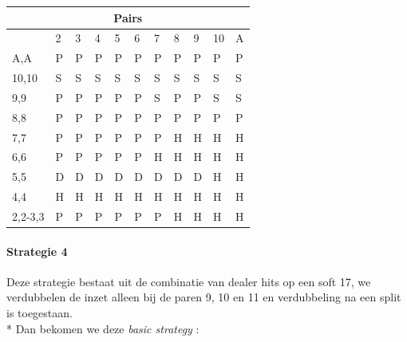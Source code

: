 \documentclass[conference]{IEEEtran}
\begin{document}
\begin{table}[ht]
\begin{tabular}{|l|l|l|l|l|l|l|l|l|l|l|}
\multicolumn{11}{|c|}{\textbf{Pairs}}                                 \\ \hline
                             & 2 & 3 & 4 & 5 & 6 & 7 & 8 & 9 & 10 & A \\ \hline
A,A                          & P & P & P & P & P & P & P & P & P & P  \\ \hline
10,10                        & S & S & S & S & S & S & S & S & S & S  \\ \hline
9,9                          & P & P & P & P & P & S & P & P & S & S  \\ \hline
8,8                          & P & P & P & P & P & P & P & P & P & P  \\ \hline
7,7                          & P & P & P & P & P & P & H & H & H & H  \\ \hline
6,6                          & P & P & P & P & P & H & H & H & H & H  \\ \hline
5,5                          & D & D & D & D & D & D & D & D & H & H  \\ \hline
4,4                          & H & H & H & H & H & H & H & H & H & H  \\ \hline
2,2-3,3                      & P & P & P & P & P & P & H & H & H & H  \\ \hline
\end{tabular}
\end{table}

\newpage

\paragraph{Strategie 4}

Deze strategie bestaat uit de combinatie van dealer hits op een soft 17, we verdubbelen de inzet alleen bij de paren 9, 10 en 11 en verdubbeling na een split is toegestaan.\\*
Dan bekomen we deze \textit{basic strategy} :
\end{document}
